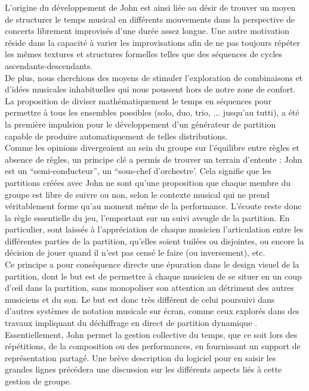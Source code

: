 \indent L'origine du développement de John est ainsi liée au désir de trouver un moyen de structurer le temps musical en différents mouvements dans la perspective de concerts librement improvisés d'une durée assez longue. Une autre motivation réside dans la capacité à varier les improvisations afin de ne pas toujours répéter les mêmes textures et structures formelles telles que des séquences de cycles ascendants-descendants.\\
\indent De plus, nous cherchions des moyens de stimuler l'exploration de combinaisons et d'idées musicales inhabituelles qui nous poussent hors de notre zone de confort. La proposition de diviser mathématiquement le temps en séquences pour permettre à tous les ensembles possibles (solo, duo, trio, ... jusqu'au tutti), a été la première impulsion pour le développement d'un générateur de partition capable de produire automatiquement de telles distributions.\\
\indent Comme les opinions divergeaient au sein du groupe sur l'équilibre entre règles et absence de règles, un principe clé a permis de trouver un terrain d'entente : John est un ``semi-conducteur'', un ``sous-chef d'orchestre'. Cela signifie que les partitions créées avec John ne sont qu'une proposition que chaque membre du groupe est libre de suivre ou non, selon le contexte musical qui ne prend véritablement forme qu'au moment même de la performance. L'écoute reste donc la règle essentielle du jeu, l'emportant sur un suivi aveugle de la partition. En particulier, sont laissés à l'appréciation de chaque musicien l'articulation entre les différentes parties de la partition, qu'elles soient tuilées ou disjointes, ou encore la décision de jouer quand il n'est pas censé le faire (ou inversement), etc.\\
\indent Ce principe a pour conséquence directe une épuration dans le design visuel de la partition, dont le but est de permettre à chaque musicien de se situer en un coup d'œil dans la partition, sans monopoliser son attention au détriment des autres musiciens et du son. Le but est donc très différent de celui poursuivi dans d'autres systèmes de notation musicale sur écran, comme ceux explorés dans des travaux impliquant du déchiffrage en direct de partition dynamique \cite{freeman_extreme_2008}.\\
\indent Essentiellement, John permet la gestion collective du temps, que ce soit lors des répétitions, de la composition ou des performances, en fournissant un support de représentation partagé. Une brève description du logiciel pour en saisir les grandes lignes précédera une discussion sur les différents aspects liés à cette gestion de groupe.

